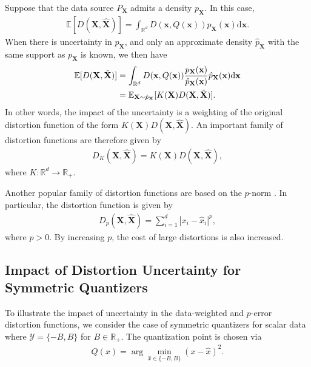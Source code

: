 \documentclass[journal]{IEEEtran}
\begin{document}
Suppose that the data source $P_{\mathbf{X}}$ admits a density $p_{\mathbf{X}}$. In this case, 
\begin{align}
	\mathbb{E}[D(\mathbf{X},\hat{\mathbf{X}})] = \int_{\mathbb{R}^d} D(\mathbf{x},Q(\mathbf{x}))p_{\mathbf{X}}(\mathbf{x})\mathrm{d}\mathbf{x}.
\end{align}
When there is uncertainty in $p_{\mathbf{X}}$, and only an approximate density $\hat{p}_{\mathbf{X}}$ with the same support as $p_{\mathbf{X}}$ is known, we then have 
\begin{align}
	\mathbb{E}[D(\mathbf{X},\hat{\mathbf{X}})] &= \int_{\mathbb{R}^d} D(\mathbf{x},Q(\mathbf{x}))\frac{p_{\mathbf{X}}(\mathbf{x})}{\hat{p}_{\mathbf{X}}(\mathbf{x})}\hat{p}_{\mathbf{X}}(\mathbf{x})\mathrm{d}\mathbf{x}\notag\\
	&= \mathbb{E}_{\mathbf{X} \sim \hat{p}_{\mathbf{X}}}[K(\mathbf{X})D(\mathbf{X},\hat{\mathbf{X}})].
\end{align}
In other words, the impact of the uncertainty is a weighting of the original distortion function of the form $K(\mathbf{X})D(\mathbf{X},\hat{\mathbf{X}})$. An important family of distortion functions are therefore given by 
\begin{align}\label{eq:weight_distort}
	D_K(\mathbf{X},\hat{\mathbf{X}}) = K(\mathbf{X})D(\mathbf{X},\hat{\mathbf{X}}),
\end{align}
where $K:\mathbb{R}^d \rightarrow \mathbb{R}_+$. 

Another popular family of distortion functions are based on the $p$-norm \cite{Linde1980algorithm,Nahshan2021loss}. In particular, the distortion function is given by 
\begin{align}\label{eq:p_norm}
	D_p(\mathbf{X},\hat{\mathbf{X}}) = \sum_{i=1}^d |x_i - \hat{x}_i|^p,
\end{align}
where $p > 0$. By increasing $p$, the cost of large distortions is also increased. 

\subsection{Impact of Distortion Uncertainty for Symmetric Quantizers}

To illustrate the impact of uncertainty in the data-weighted and $p$-error distortion functions, we consider the case of symmetric quantizers for scalar data where $\mathcal{Y} = \{-B,B\}$ for $B \in \mathbb{R}_+$. The quantization point is chosen via 
\begin{align}
	Q(x) = \arg\min_{\hat{x} \in \{-B,B\}} (x - \hat{x})^2.
\end{align}
\end{document}
